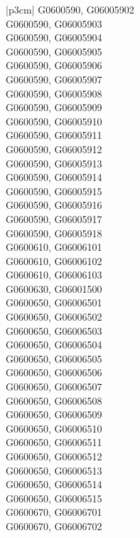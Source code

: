 \begin{customLongTable}{ |p{3cm}| }
G0600590, G06005902 \\ \hline
G0600590, G06005903 \\ \hline
G0600590, G06005904 \\ \hline
G0600590, G06005905 \\ \hline
G0600590, G06005906 \\ \hline
G0600590, G06005907 \\ \hline
G0600590, G06005908 \\ \hline
G0600590, G06005909 \\ \hline
G0600590, G06005910 \\ \hline
G0600590, G06005911 \\ \hline
G0600590, G06005912 \\ \hline
G0600590, G06005913 \\ \hline
G0600590, G06005914 \\ \hline
G0600590, G06005915 \\ \hline
G0600590, G06005916 \\ \hline
G0600590, G06005917 \\ \hline
G0600590, G06005918 \\ \hline
G0600610, G06006101 \\ \hline
G0600610, G06006102 \\ \hline
G0600610, G06006103 \\ \hline
G0600630, G06001500 \\ \hline
G0600650, G06006501 \\ \hline
G0600650, G06006502 \\ \hline
G0600650, G06006503 \\ \hline
G0600650, G06006504 \\ \hline
G0600650, G06006505 \\ \hline
G0600650, G06006506 \\ \hline
G0600650, G06006507 \\ \hline
G0600650, G06006508 \\ \hline
G0600650, G06006509 \\ \hline
G0600650, G06006510 \\ \hline
G0600650, G06006511 \\ \hline
G0600650, G06006512 \\ \hline
G0600650, G06006513 \\ \hline
G0600650, G06006514 \\ \hline
G0600650, G06006515 \\ \hline
G0600670, G06006701 \\ \hline
G0600670, G06006702 \\ \hline

\end{customLongTable}
